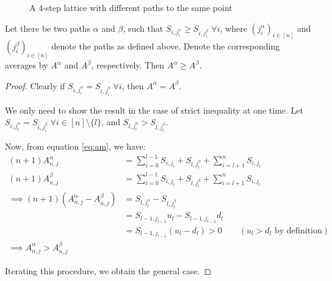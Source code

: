 \begin{figure}[h]
	\caption{A 4-step lattice with different paths to the same point}
	\label{fig:asian-paths}
\end{figure}


\begin{thm}
	\label{thm:asian-up-dn-path}
	Let there be two paths $\alpha$ and $\beta$, such that $S_{i,j_i^\alpha} \ge S_{i,j_i^\beta} \; \forall i$, where $ ( j_i^\alpha )_{i \in [n]} $ and $ ( j_i^\beta )_{i \in [n]} $ denote the paths as defined above. Denote the corresponding averages by $A^\alpha$ and $A^\beta$, respectively. Then $ A^\alpha \ge A^\beta $.
\end{thm}

\begin{proof}
	Clearly if $S_{i,j_i^\alpha} = S_{i,j_i^\beta} \; \forall i$, then $A^\alpha = A^\beta$.
	
	We only need to show the result in the case of strict inequality at one time.
	Let $ S_{i,j_i^\alpha} = S_{i,j_i^\beta} \; \forall i \in [n] \setminus \{l\} $, and $ S_{l,j_l^\alpha} > S_{l,j_l^\beta}$.
	
	Now, from equation \ref{eq:am}, we have:
	\begin{align*}
		(n+1) A_{n,j}^\alpha &= \sum_{i=0}^{l-1} S_{i,j_i} + S_{l,j_l^\alpha} + \sum_{i=l+1}^{n} S_{i,j_i} \\
		(n+1) A_{n,j}^\beta &= \sum_{i=0}^{l-1} S_{i,j_i} + S_{l,j_l^\beta} + \sum_{i=l+1}^{n} S_{i,j_i} \\
		\implies (n+1) \left(A_{n,j}^\alpha - A_{n,j}^\beta\right) &= S_{l,j_l^\alpha} - S_{l,j_l^\beta} \\
												 &= S_{l-1,j_{l-1}} u_l - S_{l-1,j_{l-1}} d_l \\
												 &= S_{l-1,j_{l-1}} (u_l - d_l) > 0 \qquad (u_l > d_l \text{ by definition}) \\
		\implies A_{n,j}^\alpha > A_{n,j}^\beta
	\end{align*}
	
	Iterating this procedure, we obtain the general case.
\end{proof}



